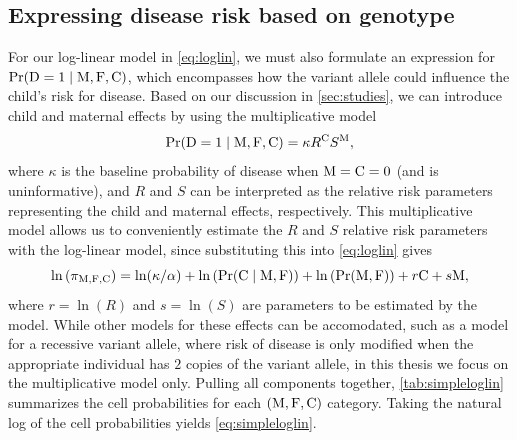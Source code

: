 \subsection{Expressing disease risk based on genotype}\label{sec:diseasemodel}

For our log-linear model in \cref{eq:loglin}, we must also formulate an expression for $\Pr({\rm D} = 1 \mid {\rm M}, {\rm F}, {\rm C})$, which encompasses how the variant allele could influence the child's risk for disease.
Based on our discussion in \cref{sec:studies}, we can introduce child and maternal effects by using the multiplicative model
\begin{equation*}
    \Pr({\rm D} = 1 \mid {\rm M}, {\rm F}, {\rm C}) = \kappa R^{{\rm C}} S^{{\rm M}},
\end{equation*}
where $\kappa$ is the baseline probability of disease when ${\rm M} = {\rm C} = 0$ (and is uninformative), and $R$ and $S$ can be interpreted as the relative risk parameters representing the child and maternal effects, respectively.
This multiplicative model allows us to conveniently estimate the $R$ and $S$ relative risk parameters with the log-linear model, since substituting this into \cref{eq:loglin} gives
\begin{equation}\label{eq:simpleloglin}
    \ln\left(\pi_{{\rm M}, {\rm F}, {\rm C}}\right) = \ln(\kappa/\alpha) + \ln\left(\Pr({\rm C} \mid {\rm M}, {\rm F})\right) + \ln\left(\Pr({\rm M}, {\rm F})\right) + r {\rm C} + s {\rm M},
\end{equation}
where $r = \ln(R)$ and $s = \ln(S)$ are parameters to be estimated by the model.
While other models for these effects can be accomodated, such as a model for a recessive variant allele, where risk of disease is only modified when the appropriate individual has $2$ copies of the variant allele, in this thesis we focus on the multiplicative model only.
Pulling all components together, \cref{tab:simpleloglin} summarizes the cell probabilities for each $({\rm M}, {\rm F}, {\rm C})$ category.
Taking the natural log of the cell probabilities yields \cref{eq:simpleloglin}.
